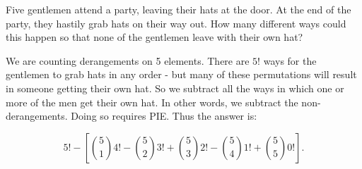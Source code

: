 \documentclass[12pt]{article}
\begin{document}
\begin{example}
  Five gentlemen attend a party, leaving their hats at the door.  At the end of the party, they hastily grab hats on their way out.  How many different ways could this happen so that none of the gentlemen leave with their own hat?
  
  \begin{solution}
    We are counting derangements on 5 elements.  There are $5!$ ways for the gentlemen to grab hats in any order - but many of these permutations will result in someone getting their own hat.  So we subtract all the ways in which one or more of the men get their own hat.  In other words, we subtract the non-derangements. Doing so requires PIE.  Thus the answer is:
    
    \[5! - \left[{5 \choose 1}4! - {5 \choose 2}3! + {5 \choose 3}2! - {5 \choose 4}1! + {5 \choose 5}0!\right].\]
  \end{solution}

\end{example}


%
%
\end{document}

